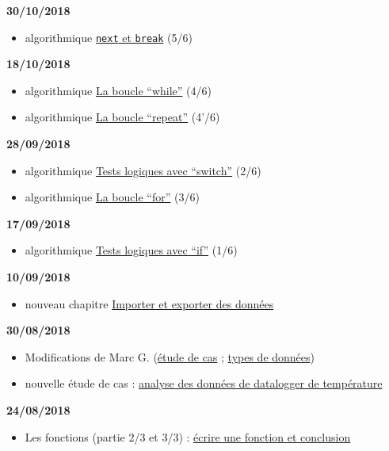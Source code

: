 \documentclass[]{book}
\providecommand{\tightlist}{%
  \setlength{\itemsep}{0pt}\setlength{\parskip}{0pt}}
\theoremstyle{definition}
\theoremstyle{definition}
\theoremstyle{definition}
\theoremstyle{remark}
\begin{document}
\textbf{30/10/2018}

\begin{itemize}
\tightlist
\item
  algorithmique \protect\hyperlink{l17spe}{\texttt{next} et
  \texttt{break}} (5/6)
\end{itemize}

\textbf{18/10/2018}

\begin{itemize}
\tightlist
\item
  algorithmique \protect\hyperlink{l17while}{La boucle ``while''} (4/6)
\item
  algorithmique \protect\hyperlink{l17repeat}{La boucle ``repeat''}
  (4'/6)
\end{itemize}

\textbf{28/09/2018}

\begin{itemize}
\tightlist
\item
  algorithmique \protect\hyperlink{l17switch}{Tests logiques avec
  ``switch''} (2/6)
\item
  algorithmique \protect\hyperlink{l17for}{La boucle ``for''} (3/6)
\end{itemize}

\textbf{17/09/2018}

\begin{itemize}
\tightlist
\item
  algorithmique \protect\hyperlink{l17if}{Tests logiques avec ``if''}
  (1/6)
\end{itemize}

\textbf{10/09/2018}

\begin{itemize}
\tightlist
\item
  nouveau chapitre \protect\hyperlink{import}{Importer et exporter des
  données}
\end{itemize}

\textbf{30/08/2018}

\begin{itemize}
\tightlist
\item
  Modifications de Marc G. (\protect\hyperlink{studyCase002}{étude de
  cas} ; \protect\hyperlink{dataType1}{types de données})
\item
  nouvelle étude de cas : \protect\hyperlink{studyCase001}{analyse des
  données de datalogger de température}
\end{itemize}

\textbf{24/08/2018}

\begin{itemize}
\tightlist
\item
  Les fonctions (partie 2/3 et 3/3) :
  \protect\hyperlink{l015function}{écrire une fonction et conclusion}
\end{itemize}
\end{document}
